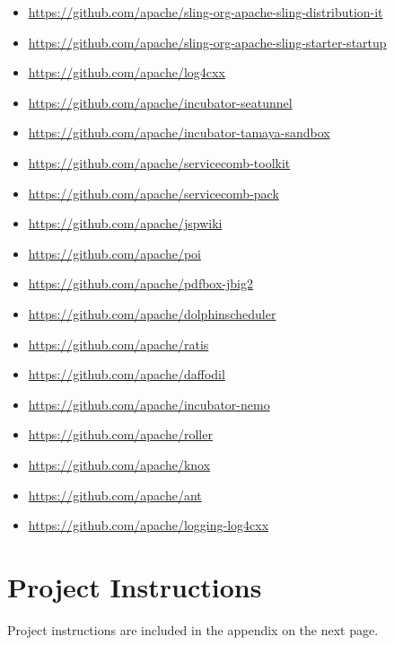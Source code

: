 \documentclass[sigconf]{acmart}
\begin{document}
\begin{itemize}
  \item \url{https://github.com/apache/sling-org-apache-sling-distribution-it}
  \item \url{https://github.com/apache/sling-org-apache-sling-starter-startup}
  \item \url{https://github.com/apache/log4cxx}
  \item \url{https://github.com/apache/incubator-seatunnel}
  \item \url{https://github.com/apache/incubator-tamaya-sandbox}
  \item \url{https://github.com/apache/servicecomb-toolkit}
  \item \url{https://github.com/apache/servicecomb-pack}
  \item \url{https://github.com/apache/jspwiki}
  \item \url{https://github.com/apache/poi}
  \item \url{https://github.com/apache/pdfbox-jbig2}
  \item \url{https://github.com/apache/dolphinscheduler}
  \item \url{https://github.com/apache/ratis}
  \item \url{https://github.com/apache/daffodil}
  \item \url{https://github.com/apache/incubator-nemo}
  \item \url{https://github.com/apache/roller}
  \item \url{https://github.com/apache/knox}
  \item \url{https://github.com/apache/ant}
  \item \url{https://github.com/apache/logging-log4cxx}

\end{itemize}
\newpage
\appendix
\section{Project Instructions}
Project instructions are included in the appendix on the next page.


\end{document}
